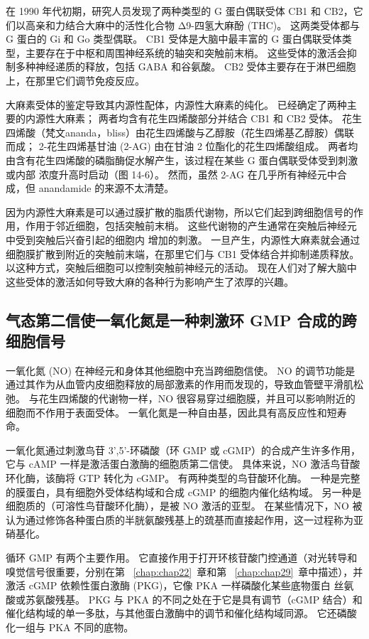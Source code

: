 在 1990 年代初期，研究人员发现了两种类型的 G 蛋白偶联受体 CB1 和 CB2，它们以高亲和力结合大麻中的活性化合物 Δ9-四氢大麻酚 (THC)。
这两类受体都与 G 蛋白的 Gi 和 Go 类型偶联。
CB1 受体是大脑中最丰富的 G 蛋白偶联受体类型，主要存在于中枢和周围神经系统的轴突和突触前末梢。
这些受体的激活会抑制多种神经递质的释放，包括 GABA 和谷氨酸。
CB2 受体主要存在于淋巴细胞上，在那里它们调节免疫反应。


大麻素受体的鉴定导致其内源性配体，内源性大麻素的纯化。
已经确定了两种主要的内源性大麻素；
两者均含有花生四烯酸部分并结合 CB1 和 CB2 受体。 
花生四烯酸（梵文ananda，bliss）由花生四烯酸与乙醇胺（花生四烯基乙醇胺）偶联而成；
2-花生四烯基甘油 (2-AG) 由在甘油 2 位酯化的花生四烯酸组成。
两者均由含有花生四烯酸的磷脂酶促水解产生，该过程在某些 G 蛋白偶联受体受到刺激或内部  浓度升高时启动（图 14-6）。
然而，虽然 2-AG 在几乎所有神经元中合成，但 anandamide 的来源不太清楚。


因为内源性大麻素是可以通过膜扩散的脂质代谢物，所以它们起到跨细胞信号的作用，作用于邻近细胞，包括突触前末梢。
这些代谢物的产生通常在突触后神经元中受到突触后兴奋引起的细胞内  增加的刺激。
一旦产生，内源性大麻素就会通过细胞膜扩散到附近的突触前末端，在那里它们与 CB1 受体结合并抑制递质释放。
以这种方式，突触后细胞可以控制突触前神经元的活动。 
现在人们对了解大脑中这些受体的激活如何导致大麻的各种行为影响产生了浓厚的兴趣。



\subsection{气态第二信使一氧化氮是一种刺激环 GMP 合成的跨细胞信号}

一氧化氮 (NO) 在神经元和身体其他细胞中充当跨细胞信使。
NO 的调节功能是通过其作为从血管内皮细胞释放的局部激素的作用而发现的，导致血管壁平滑肌松弛。
与花生四烯酸的代谢物一样，NO 很容易穿过细胞膜，并且可以影响附近的细胞而不作用于表面受体。
一氧化氮是一种自由基，因此具有高反应性和短寿命。


一氧化氮通过刺激鸟苷 3',5'-环磷酸（环 GMP 或 cGMP）的合成产生许多作用，它与 cAMP 一样是激活蛋白激酶的细胞质第二信使。
具体来说，NO 激活鸟苷酸环化酶，该酶将 GTP 转化为 cGMP。
有两种类型的鸟苷酸环化酶。 
一种是完整的膜蛋白，具有细胞外受体结构域和合成 cGMP 的细胞内催化结构域。
另一种是细胞质的（可溶性鸟苷酸环化酶），是被 NO 激活的亚型。
在某些情况下，NO 被认为通过修饰各种蛋白质的半胱氨酸残基上的巯基而直接起作用，这一过程称为亚硝基化。


循环 GMP 有两个主要作用。 它直接作用于打开环核苷酸门控通道（对光转导和嗅觉信号很重要，分别在第 ~\ref{chap:chap22}~章和第 ~\ref{chap:chap29}~章中描述），并激活 cGMP 依赖性蛋白激酶 (PKG)，它像 PKA 一样磷酸化某些底物蛋白 丝氨酸或苏氨酸残基。
PKG 与 PKA 的不同之处在于它是具有调节（cGMP 结合）和催化结构域的单一多肽，与其他蛋白激酶中的调节和催化结构域同源。
它还磷酸化一组与 PKA 不同的底物。


